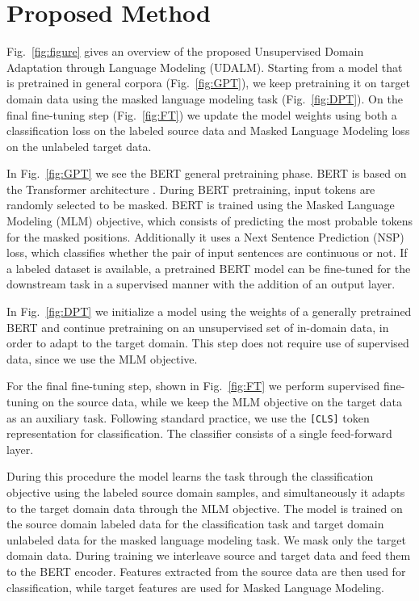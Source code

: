 \documentclass[11pt]{article}
\begin{document}
\section{Proposed Method}
\label{sec:proposed}

Fig.~\ref{fig:figure} gives an overview of the proposed Unsupervised Domain Adaptation through Language Modeling (UDALM). Starting from a model that is pretrained in general corpora (Fig.~\ref{fig:GPT}), we keep pretraining it on target domain data using the masked language modeling task (Fig.~\ref{fig:DPT}). On the final fine-tuning step (Fig.~\ref{fig:FT}) we update the model weights using both a classification loss on the labeled source data and Masked Language Modeling loss on the unlabeled target data.

In Fig.~\ref{fig:GPT} we see the BERT general pretraining phase. BERT \citep{devlin-etal-2019-bert} is based on the Transformer architecture \cite{vaswani2017attention}. 
During BERT pretraining, input tokens are randomly selected to be masked. 
BERT is trained using the Masked Language Modeling (MLM) objective, which consists of predicting the most probable tokens for the masked positions. 
Additionally it uses a Next Sentence Prediction (NSP) loss, which classifies whether the pair of input sentences are continuous or not.
If a labeled dataset is available, a pretrained BERT model can be fine-tuned for the downstream task in a supervised manner with the addition of an output layer. 

In Fig.~\ref{fig:DPT} we initialize a model using the weights of a generally pretrained BERT and continue pretraining on an unsupervised set of in-domain data, in order to adapt to the target domain. This step does not require use of supervised data, since we use the MLM objective.

For the final fine-tuning step, shown in Fig.~\ref{fig:FT} we perform supervised fine-tuning on the source data, while we keep the MLM objective on the target data as an auxiliary task.
Following standard practice, we use the \texttt{[CLS]} token representation for classification. The classifier consists of a single feed-forward layer.

During this procedure the model learns the task through the classification objective using the labeled source domain samples, and simultaneously it adapts to the target domain data through the MLM objective.
The model is trained on the source domain labeled data for the classification task and target domain unlabeled data for the masked language modeling task. We mask only the target domain data. During training we interleave source and target data and feed them to the BERT encoder. Features extracted from the source data are then used for classification, while target features are used for Masked Language Modeling. 
\end{document}
